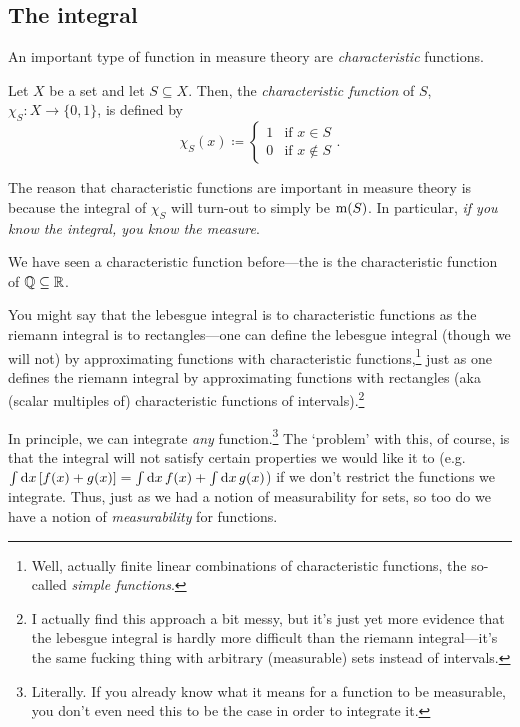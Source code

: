 \subsection{The integral}

An important type of function in measure theory are \emph{characteristic} functions.
\begin{dfn}
Let $X$ be a set and let $S\subseteq X$.  Then, the \emph{characteristic function} of $S$, $\chi _S:X\rightarrow \{ 0,1\}$, is defined by
\begin{equation}
\chi _S(x)\coloneqq \begin{cases}1 & \text{if }x\in S \\ 0 & \text{if }x\notin S\end{cases}.
\end{equation}
\begin{rmk}
The reason that characteristic functions are important in measure theory is because the integral of $\chi _S$ will turn-out to simply be $\mathrm{m} (S)$.  In particular, \emph{if you know the integral, you know the measure}.
\end{rmk}
\begin{rmk}
We have seen a characteristic function before---the  is the characteristic function of $\mathbb{Q} \subseteq \mathbb{R}$.
\end{rmk}
\begin{rmk}
You might say that the lebesgue integral is to characteristic functions as the riemann integral is to rectangles---one can define the lebesgue integral (though we will not) by approximating functions with characteristic functions,\footnote{Well, actually finite linear combinations of characteristic functions, the so-called \emph{simple functions}.} just as one defines the riemann integral by approximating functions with rectangles (aka (scalar multiples of) characteristic functions of intervals).\footnote{I actually find this approach a bit messy, but it's just yet more evidence that the lebesgue integral is hardly more difficult than the riemann integral---it's the same fucking thing with arbitrary (measurable) sets instead of intervals.}
\end{rmk}
\end{dfn}
In principle, we can integrate \emph{any} function.\footnote{Literally.  If you already know what it means for a function to be measurable, you don't even need this to be the case in order to integrate it.}  The `problem' with this, of course, is that the integral will not satisfy certain properties we would like it to (e.g.~$\int \mathop{}\!\mathrm{d} x\, [f(x)+g(x)]=\int \mathop{}\!\mathrm{d} x\, f(x)+\int \mathop{}\!\mathrm{d} x\, g(x)$) if we don't restrict the functions we integrate.  Thus, just as we had a notion of measurability for sets, so too do we have a notion of \emph{measurability} for functions.
